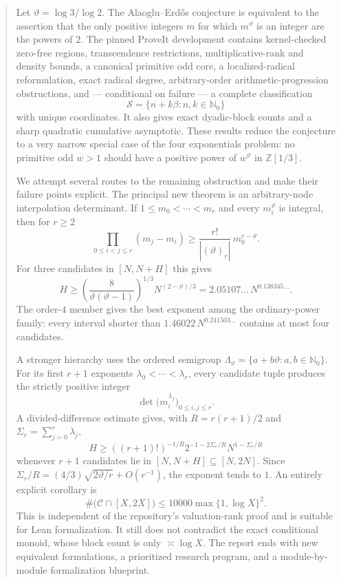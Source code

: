\documentclass[11pt,oneside]{article}
\theoremstyle{definition}
\theoremstyle{remark}
\newcommand{\Nzero}{\mathbb N_0}
\newcommand{\Z}{\mathbb Z}
\newcommand{\thetaq}{\vartheta}
\newcommand{\Sol}{\mathcal S}
\newcommand{\Cand}{\mathcal C}
\newcommand{\LambdaTheta}{\Lambda_{\thetaq}}
\newcommand{\fall}[2]{\left(#1\right)_{\!\underline{#2}}}
\begin{document}

\begin{abstract}
Let $\thetaq=\log 3/\log 2$.  The Alaoglu--Erd\H{o}s conjecture is equivalent to the assertion
that the only positive integers $m$ for which $m^{\thetaq}$ is an integer are the powers of
$2$.  The pinned ProveIt development contains kernel-checked zero-free regions,
transcendence restrictions, multiplicative-rank and density bounds, a canonical primitive odd
core, a localized-radical reformulation, exact radical degree, arbitrary-order
arithmetic-progression obstructions, and --- conditional on failure --- a complete
classification
\[
   \Sol=\{n+k\beta:n,k\in\Nzero\}
\]
with unique coordinates.  It also gives exact dyadic-block counts and a sharp quadratic
cumulative asymptotic.  These results reduce the conjecture to a very narrow special case of
the four exponentials problem: no primitive odd $w>1$ should have a positive power of
$w^{\thetaq}$ in $\Z[1/3]$.

We attempt several routes to the remaining obstruction and make their failure points explicit.
The principal new theorem is an arbitrary-node interpolation determinant.  If
$1\le m_0<\cdots<m_r$ and every $m_i^{\thetaq}$ is integral, then for $r\ge2$
\[
 \prod_{0\le i<j\le r}(m_j-m_i)
 \ge
 \frac{r!}{|\fall{\thetaq}{r}|}\,m_0^{r-\thetaq}.
\]
For three candidates in $[N,N+H]$ this gives
\[
 H\ge
 \left(\frac{8}{\thetaq(\thetaq-1)}\right)^{1/3}
 N^{(2-\thetaq)/3}
 =2.05107\ldots\,N^{0.138345\ldots}.
\]
The order-$4$ member gives the best exponent among the ordinary-power family: every interval
shorter than $1.46022\,N^{0.241503\ldots}$ contains at most four candidates.

A stronger hierarchy uses the ordered semigroup
$\LambdaTheta=\{a+b\thetaq:a,b\in\Nzero\}$.  For its first $r+1$ exponents
$\lambda_0<\cdots<\lambda_r$, every candidate tuple produces the strictly positive integer
\[
  \det\bigl(m_i^{\lambda_j}\bigr)_{0\le i,j\le r}.
\]
A divided-difference estimate gives, with
$R=r(r+1)/2$ and $\Sigma_r=\sum_{j=0}^r\lambda_j$,
\[
 H\ge ((r+1)!)^{-1/R}2^{-1-2\Sigma_r/R}
       N^{1-\Sigma_r/R}
\]
whenever $r+1$ candidates lie in $[N,N+H]\subseteq[N,2N]$.
Since
$\Sigma_r/R=(4/3)\sqrt{2\thetaq/r}+O(r^{-1})$, the exponent tends to $1$.
An entirely explicit corollary is
\[
 \#\bigl(\Cand\cap[X,2X]\bigr)
 \le 10000\max\{1,\log X\}^{2}.
\]
This is independent of the repository's valuation-rank proof and is suitable for Lean
formalization.  It still does not contradict the exact conditional monoid, whose block count
is only $\asymp\log X$.  The report ends with new equivalent formulations, a prioritized
research program, and a module-by-module formalization blueprint.
\end{abstract}
\end{document}
